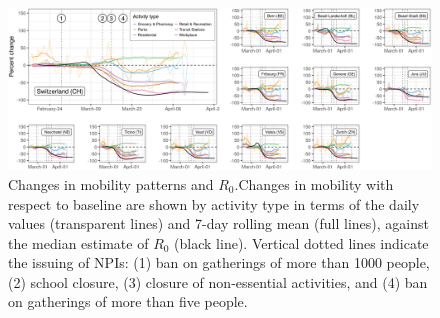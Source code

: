 \begin{figure}\centering
  \includegraphics{fig_covid-switzerland-npi/FIGURE_3.png}
  \caption[Changes in mobility patterns and $R_0$]{Changes in mobility patterns and $R_0$.Changes in mobility with respect to baseline are shown by activity type in terms of the daily values (transparent lines) and 7-day rolling mean (full lines), against the median estimate of $R_0$ (black line). Vertical dotted lines indicate the issuing of NPIs: (1) ban on gatherings of more than 1000 people, (2) school closure, (3) closure of non-essential activities, and (4) ban on gatherings of more than five people.}
  \label{fig:covid-ch-mobility}
\end{figure}

